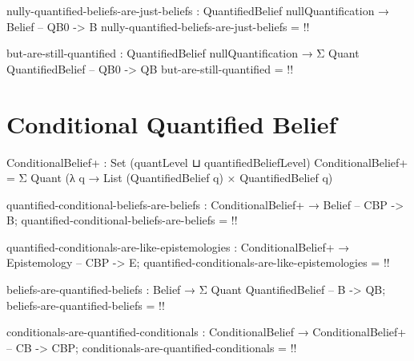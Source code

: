 \documentclass{article}
\begin{document}
\begin{code}
nully-quantified-beliefs-are-just-beliefs :
  QuantifiedBelief nullQuantification → Belief -- QB0 -> B
nully-quantified-beliefs-are-just-beliefs = {!!}
\end{code}

\begin{code}
but-are-still-quantified :
  QuantifiedBelief nullQuantification →
  Σ Quant QuantifiedBelief -- QB0 -> QB
but-are-still-quantified = {!!}
\end{code}

\section{Conditional Quantified Belief}

\begin{code}
ConditionalBelief+ : Set (quantLevel ⊔ quantifiedBeliefLevel)
ConditionalBelief+ = Σ Quant (λ q → List (QuantifiedBelief q)
                                  × QuantifiedBelief q)
\end{code}

\begin{code}
quantified-conditional-beliefs-are-beliefs :
  ConditionalBelief+ → Belief -- CBP -> B;
quantified-conditional-beliefs-are-beliefs = {!!}
\end{code}

\begin{code}
quantified-conditionals-are-like-epistemologies :
  ConditionalBelief+ → Epistemology -- CBP -> E;
quantified-conditionals-are-like-epistemologies = {!!}
\end{code}

\begin{code}
beliefs-are-quantified-beliefs :
  Belief → Σ Quant QuantifiedBelief -- B -> QB;
beliefs-are-quantified-beliefs = {!!}
\end{code}

\begin{code}
conditionals-are-quantified-conditionals :
  ConditionalBelief → ConditionalBelief+ -- CB -> CBP;
conditionals-are-quantified-conditionals = {!!}
\end{code}
\end{document}

